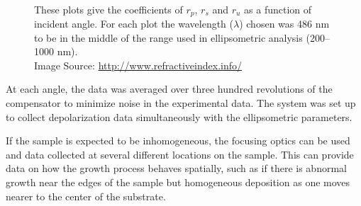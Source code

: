 \begin{figure}[tbp]
   \centering
    \\
   \caption[Polarized Reflectance vs. Incident Angle]%
   		{These plots give the coefficients of $r_{p}$, $r_{s}$ and $r_{u}$ as a function of incident angle. %
		\cite{refractive_index} For each plot the wavelength ($\lambda$) chosen was 486 nm to be in the middle %
		of the range used in ellipsometric analysis (200--1000 nm).\\%
		{\tiny Image Source: \url{http://www.refractiveindex.info/}\cite{refractive_index}}}
   \label{fig:reflection}
\end{figure}

At each angle, the data was averaged over three hundred revolutions of the compensator to minimize noise in the experimental data. The system was set up to collect depolarization data simultaneously with the ellipsometric parameters.\cite{WVASE-manual} 

If the sample is expected to be inhomogeneous, the focusing optics can be used and data collected at several different locations on the sample. This can provide data on how the growth process behaves spatially, such as if there is abnormal growth near the edges of the sample but homogeneous deposition as one moves nearer to the center of the substrate. 

